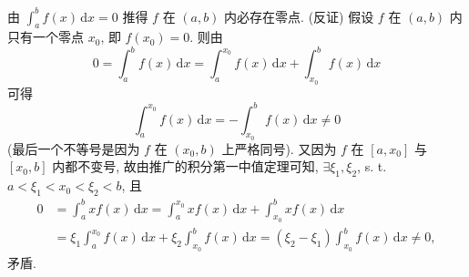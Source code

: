 \begin{solution}[证法 2]
由 $\int_{a}^{b}f(x)\,\mathrm{d}x=0$ 推得 $f$ 在 $(a,b)$ 内必存在零点. (反证) 假设 $f$ 在 $(a,b)$ 内只有一个零点 $x_{0}$, 即 $f(x_{0})=0$. 则由
\[
0=\int_{a}^{b}f(x)\,\mathrm{d}x=\int_{a}^{x_{0}}f(x)\,\mathrm{d}x+\int_{x_{0}}^{b}f(x)\,\mathrm{d}x
\]
可得
\[
\int_{a}^{x_{0}}f(x)\,\mathrm{d}x=-\int_{x_{0}}^{b}f(x)\,\mathrm{d}x\neq 0
\]
(最后一个不等号是因为 $f$ 在 $(x_{0},b)$ 上严格同号). 又因为 $f$ 在 $[a,x_{0}]$ 与 $[x_{0},b]$ 内都不变号, 故由推广的积分第一中值定理可知, $\exists\xi_{1},\xi_{2}$, s. t. $a<\xi_{1}<x_{0}<\xi_{2}<b$, 且
\begin{align*}
0&=\int_{a}^{b}xf(x)\,\mathrm{d}x=\int_{a}^{x_{0}}xf(x)\,\mathrm{d}x+\int_{x_{0}}^{b}xf(x)\,\mathrm{d}x\\
&=\xi_{1}\int_{a}^{x_{0}}f(x)\,\mathrm{d}x+\xi_{2}\int_{x_{0}}^{b}f(x)\,\mathrm{d}x=(\xi_{2}-\xi_{1})\int_{x_{0}}^{b}f(x)\,\mathrm{d}x\neq 0,
\end{align*}
矛盾.
\end{solution}

